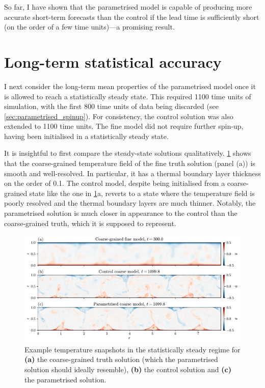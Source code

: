 \documentclass[../main.tex]{subfiles}
\begin{document}
So far, I have shown that the parametrised model is capable of producing
more accurate short-term forecasts than the control if the lead time is
sufficiently short (on the order of a few time units)---a promising result.


\section{Long-term statistical accuracy}
\label{sec:climate}
I next consider the long-term mean properties of the parametrised model once it
is allowed to reach a statistically steady state. This required 1100 time units
of simulation, with the first 800 time units of data being discarded (see
\cref{sec:parametrised_spinup}). For consistency, the control solution was
also extended to 1100 time units. The fine model did not require further
spin-up, having been initialised in a statistically steady state.

It is insightful to first compare the steady-state solutions qualitatively.
\cref{fig:steady_state_vis} shows that the coarse-grained temperature field of
the fine truth solution (panel (a)) is smooth and well-resolved. In particular,
it has a thermal boundary layer thickness on the order of 0.1. The control
model, despite being initialised from a coarse-grained state like the one in
\cref{fig:steady_state_vis}a, reverts to a state where the temperature field is
poorly resolved and the thermal boundary layers are much thinner. Notably, the
parametrised solution is much closer in appearance to the control than the
coarse-grained truth, which it is supposed to represent.

\begin{figure}[ht]
    \centering
    \includegraphics[width=\linewidth]{figures/steady_state_vis.pdf}
    \caption{
        Example temperature snapshots in the statistically steady regime for
        \textbf{(a)} the coarse-grained truth solution (which the parametrised
        solution should ideally resemble), \textbf{(b)} the control solution
        and \textbf{(c)} the parametrised solution.
    }
    \label{fig:steady_state_vis}
\end{figure}
\end{document}
